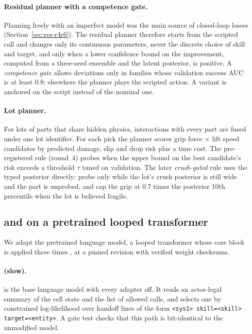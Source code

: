 \paragraph{Residual planner with a competence gate.} Planning freely with an imperfect model was the main source
of closed-loop losses (Section~\ref{sec:res-r4r6}). The residual planner therefore starts from the scripted
call and changes only its continuous parameters, never the discrete choice of skill and target, and only when
a lower confidence bound on the improvement, computed from a three-seed ensemble and the latent posterior, is
positive. A \emph{competence gate} allows deviations only in families whose validation success AUC is at least
0.8; elsewhere the planner plays the scripted action. A variant is anchored on the \pta{} script instead of the
nominal one.

\paragraph{Lot planner.} For lots of parts that share hidden physics, interactions with every part are fused
under one lot identifier. For each pick the planner scores grip force $\times$ lift speed candidates by
predicted damage, slip and drop risk plus a time cost. The pre-registered rule (round~4) probes when the upper
bound on the best candidate's risk exceeds a threshold $\tau$ tuned on validation. The later \emph{crush-gated}
rule uses the typed posterior directly: probe only while the lot's crush posterior is still wide and the part
is unprobed, and cap the grip at 0.7 times the posterior 10th percentile when the lot is believed fragile.

\subsection{\sysI{} and \sysII{} on a pretrained looped transformer}
\label{sec:inkling}

We adapt the pretrained \inkling{} language model, a looped transformer whose core block is applied three times
\citep{dehghani2019universal}, at a pinned revision with verified weight checksums.

\paragraph{\sysII{} (slow).} \sysII{} is the base language model with every adapter off. It reads an
actor-legal summary of the cell state and the list of allowed calls, and selects one by constrained
log-likelihood over handoff lines of the form \texttt{<sys1> skill=<skill> target=<entity>}. A gate test
checks that this path is bit-identical to the unmodified model.

